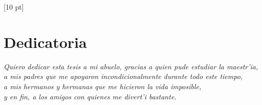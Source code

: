 \titleformat{\chapter}{\Huge\bfseries}{\thechapter}{0 pt}{\rule{340 pt}{3 pt}\\}
\titlespacing{\chapter}{100 pt}{-25 pt}{40 pt}[10 pt]	
\pagestyle{fancy}
\fancyhead[RO,RE]{\thepage}
\fancyfoot[CO,CE]{}

\chapter*{Dedicatoria}

\vspace{140 pt}

\normalsize
\begin{flushright}
\textit{Quiero dedicar esta tesis a mi abuelo, gracias a quien pude estudiar la maestr'ia,\\ a mis padres que me apoyaron incondicionalmente durante todo este tiempo,\\ a mis hermanos y hermanas que me hicieron la vida imposible,\\ y en fin, a los amigos con quienes me divert'i bastante.}
\end{flushright}
\clearpage